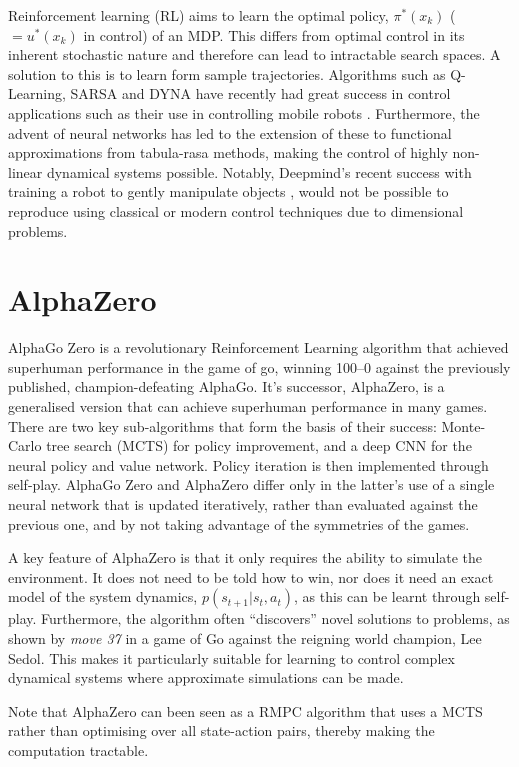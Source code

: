 \documentclass[../main.tex]{subfiles}
\begin{document}
Reinforcement learning (RL) aims to learn the optimal policy, $\pi^{*}(x_k)$ ($=u^{*}(x_k)$ in control) of an MDP. This differs from optimal control in its inherent stochastic nature and therefore can lead to intractable search spaces. A solution to this is to learn form sample trajectories. Algorithms such as Q-Learning, SARSA and DYNA have recently had great success in control applications such as their use in controlling mobile robots \cite{Qlearning, RLoverview}. Furthermore, the advent of neural networks has led to the extension of these to functional approximations from tabula-rasa methods, making the control of highly non-linear dynamical systems possible. Notably, Deepmind's recent success with training a robot to gently manipulate objects \cite{Robothand}, would not be possible to reproduce using classical or modern control techniques due to dimensional problems.

\section{AlphaZero}
AlphaGo Zero is a revolutionary Reinforcement Learning algorithm that achieved superhuman performance in the game of go, winning 100–0 against the previously published, champion-defeating AlphaGo. It's successor, AlphaZero, is a generalised version that can achieve superhuman performance in many games. There are two key sub-algorithms that form the basis of their success: Monte-Carlo tree search (MCTS) for policy improvement, and a deep CNN for the neural policy and value network. Policy iteration is then implemented through self-play. AlphaGo Zero and AlphaZero differ only in the latter's use of a single neural network that is updated iteratively, rather than evaluated against the previous one, and by not taking advantage of the symmetries of the games.

A key feature of AlphaZero is that it only requires the ability to simulate the environment. It does not need to be told how to win, nor does it need an exact model of the system dynamics, $p(s_{t+1} |s_t, a_t)$, as this can be learnt through self-play. Furthermore, the algorithm often ``discovers'' novel solutions to problems, as shown by \textit{move 37} in a game of Go against the reigning world champion, Lee Sedol. This makes it particularly suitable for learning to control complex dynamical systems where approximate simulations can be made.

Note that AlphaZero can been seen as a RMPC algorithm that uses a MCTS rather than optimising over all state-action pairs, thereby making the computation tractable.
\end{document}

